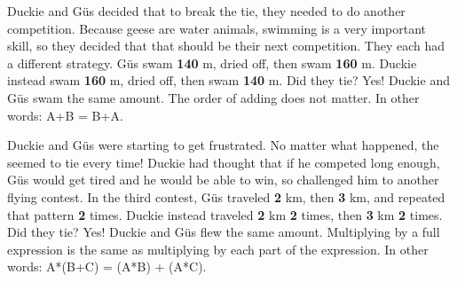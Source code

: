 {Duckie and Güs decided that to break the tie, they needed to do another competition. \linebreak Because geese are water animals, swimming is a very important skill, so they decided that that should be their next competition. They each had a different strategy. Güs swam \textbf{140} m, dried off, then swam \textbf{160} m. Duckie instead swam \textbf{160} m, dried off, then swam \textbf{140} m. Did they tie?}
{Yes! Duckie and Güs swam the same amount.}
{The order of adding does not matter. In other words: A+B = B+A.}
{}
{Duckie and Güs were starting to get frustrated. No matter what happened, the seemed to tie every time! Duckie had thought that if he competed long enough, Güs would get tired and he would be able to win, so challenged him to another flying contest. In the third contest, Güs traveled \textbf{2} km, then \textbf{3} km, and repeated that pattern \textbf{2} times. Duckie instead traveled \textbf{2} km \textbf{2} times, then \textbf{3} km \textbf{2} times. Did they tie?}
{Yes! Duckie and Güs flew the same amount.}
{Multiplying by a full expression is the same as multiplying by each part of the expression. In other words: A*(B+C) = (A*B) + (A*C).}
